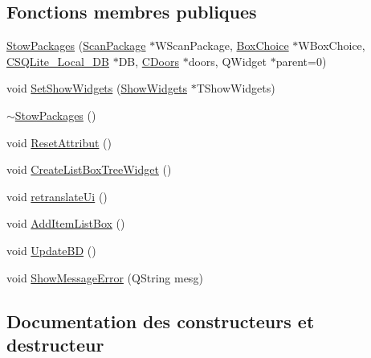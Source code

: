 \subsection*{Fonctions membres publiques}
\begin{DoxyCompactItemize}
\item 
\hyperlink{class_stow_packages_a116abaad4fab9f0dd7f243d99594b6f3}{Stow\+Packages} (\hyperlink{class_scan_package}{Scan\+Package} $\ast$W\+Scan\+Package, \hyperlink{class_box_choice}{Box\+Choice} $\ast$W\+Box\+Choice, \hyperlink{class_c_s_q_lite___local___d_b}{C\+S\+Q\+Lite\+\_\+\+Local\+\_\+\+D\+B} $\ast$D\+B, \hyperlink{class_c_doors}{C\+Doors} $\ast$doors, Q\+Widget $\ast$parent=0)
\item 
void \hyperlink{class_stow_packages_a38db31fd7c9b55a48c311824545c9862}{Set\+Show\+Widgets} (\hyperlink{class_show_widgets}{Show\+Widgets} $\ast$T\+Show\+Widgets)
\item 
\hyperlink{class_stow_packages_ae72794bc7847edf6c2e9f0a6562e082c}{$\sim$\+Stow\+Packages} ()
\item 
void \hyperlink{class_stow_packages_a16c2f10abbc1744637130db6751314e3}{Reset\+Attribut} ()
\item 
void \hyperlink{class_stow_packages_af44ae7fc4cb1912eb0c115e8aa0a0308}{Create\+List\+Box\+Tree\+Widget} ()
\item 
void \hyperlink{class_stow_packages_a601efd214a21274ede3557ac167bb139}{retranslate\+Ui} ()
\item 
void \hyperlink{class_stow_packages_acc69e1e77791772697997020576d2a47}{Add\+Item\+List\+Box} ()
\item 
void \hyperlink{class_stow_packages_ad7a5a6b267b9546bac97f2ab8e9ed6d5}{Update\+B\+D} ()
\item 
void \hyperlink{class_stow_packages_a3d99782b5a47da2a080f6e0754e27864}{Show\+Message\+Error} (Q\+String mesg)
\end{DoxyCompactItemize}


\subsection{Documentation des constructeurs et destructeur}
\hypertarget{class_stow_packages_a116abaad4fab9f0dd7f243d99594b6f3}{}
